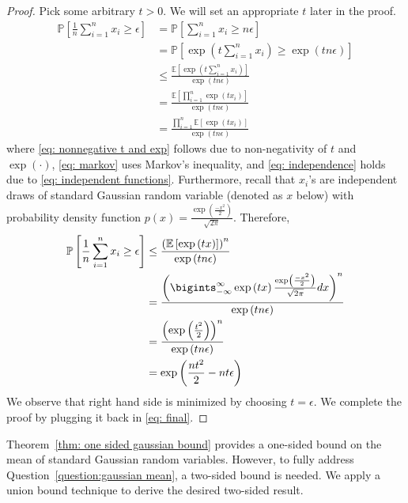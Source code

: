 \documentclass[11pt]{article}
\newcommand{\E}[1]{\mathbb{E}\left[ #1 \right]}
\newcommand{\prob}[1]{\mathbb{P}\left[ #1 \right]}
\begin{document}
\begin{proof}
    Pick some arbitrary $t > 0$. We will set an appropriate $t$ later in the proof.
    \begin{align}
         \prob{\frac{1}{n} \sum_{i=1}^n x_i \geq \epsilon} &=  \prob{ \sum_{i=1}^n x_i \geq n\epsilon} \\
         &=  \prob{ \exp\left(t\sum_{i=1}^n x_i \right) \geq \exp\left(tn\epsilon\right)} \label{eq: nonnegative t and exp}\\
         &\leq \frac{\E{\exp\left(t\sum_{i=1}^n x_i \right)}}{\exp\left(tn\epsilon\right)} \label{eq: markov}\\
         &= \frac{\E{\prod_{i=1}^n\exp\left(t x_i \right)}}{\exp\left(tn\epsilon\right)} \label{eq: sum to prod}\\
         &= \frac{\prod_{i=1}^n\E{\exp\left(t x_i \right)}}{\exp\left(tn\epsilon\right)} \label{eq: independence}
    \end{align}
    where \eqref{eq: nonnegative t and exp} follows due to non-negativity of $t$ and $\exp(\cdot)$, \eqref{eq: markov} uses Markov's inequality, and \eqref{eq: independence} holds due to \eqref{eq: independent functions}. Furthermore, recall that $x_i$'s are independent draws of standard Gaussian random variable (denoted as $x$ below) with probability density function $p(x) = \frac{\exp\left( \frac{-x^2}{2}\right)}{\sqrt{2\pi}}$. Therefore,  
    \begin{align}
         \prob{\frac{1}{n} \sum_{i=1}^n x_i \geq \epsilon} &\leq \frac{\left(\E{\exp\left(t x \right)}\right)^n}{\exp\left(tn\epsilon\right)} \label{eq: iid}\\
         &=\frac{\left(\bigints_{-\infty}^\infty \exp\left(tx\right) \frac{\exp\left( \frac{-x^2}{2}\right)}{\sqrt{2\pi}} dx \right)^n}{\exp\left(tn\epsilon\right)} \label{eq: integration}\\
          &=\frac{\left( \exp\left(\frac{t^2}{2}\right) \right)^n}{\exp\left(tn\epsilon\right)} \label{eq: integration ans}\\
          &= \exp\left(\frac{nt^2}{2} - nt\epsilon  \right) \label{eq: final}
    \end{align}
    We observe that right hand side is minimized by choosing $t = \epsilon$. We complete the proof by plugging it back in \eqref{eq: final}.
\end{proof}

Theorem~\ref{thm: one sided gaussian bound} provides a one-sided bound on the mean of standard Gaussian random variables. However, to fully address Question~\ref{question:gaussian mean}, a two-sided bound is needed. We apply a union bound technique to derive the desired two-sided result.
\end{document}
